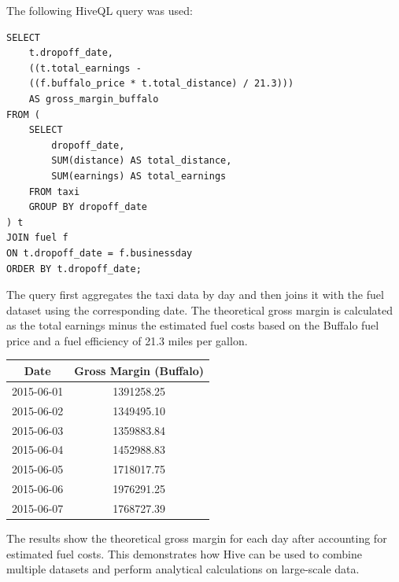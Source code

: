 \documentclass[12pt,ngerman]{scrartcl}
\begin{document}
The following HiveQL query was used:

\begin{verbatim}
SELECT
    t.dropoff_date,
    ((t.total_earnings -
    ((f.buffalo_price * t.total_distance) / 21.3)))
    AS gross_margin_buffalo
FROM (
    SELECT
        dropoff_date,
        SUM(distance) AS total_distance,
        SUM(earnings) AS total_earnings
    FROM taxi
    GROUP BY dropoff_date
) t
JOIN fuel f
ON t.dropoff_date = f.businessday
ORDER BY t.dropoff_date;
\end{verbatim}

The query first aggregates the taxi data by day and then joins it with the fuel dataset using the corresponding date. The theoretical gross margin is calculated as the total earnings minus the estimated fuel costs based on the Buffalo fuel price and a fuel efficiency of 21.3 miles per gallon.

\begin{center}
\begin{tabular}{|c|c|}
\hline
Date & Gross Margin (Buffalo) \\
\hline
2015-06-01 & 1391258.25 \\
2015-06-02 & 1349495.10 \\
2015-06-03 & 1359883.84 \\
2015-06-04 & 1452988.83 \\
2015-06-05 & 1718017.75 \\
2015-06-06 & 1976291.25 \\
2015-06-07 & 1768727.39 \\
\hline
\end{tabular}
\end{center}

The results show the theoretical gross margin for each day after accounting for estimated fuel costs. This demonstrates how Hive can be used to combine multiple datasets and perform analytical calculations on large-scale data.
\end{document}
